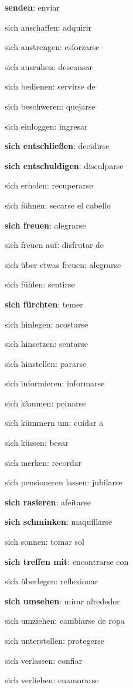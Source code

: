\begin{multicols}{2}
\begin{myitemize}
\item \textbf{senden}: enviar
\item sich anschaffen: adquirir
\item sich anstrengen: esforzarse
\item sich ausruhen: descansar
\item sich bedienen: servirse de
\item sich beschweren: quejarse
\item sich einloggen: ingresar
\item \textbf{sich entschließen}: decidirse
\item \textbf{sich entschuldigen}: disculparse
\item sich erholen: recuperarse
\item sich föhnen: secarse el cabello
\item \textbf{sich freuen}: alegrarse
\item sich freuen auf: disfrutar de
\item sich über etwas freuen: alegrarse
\item sich fühlen: sentirse
\item \textbf{sich fürchten}: temer
\item sich hinlegen: acostarse
\item sich hinsetzen: sentarse
\item sich hinstellen: pararse
\item sich informieren: informarse
\item sich kämmen: peinarse
\item sich kümmern um: cuidar a
\item sich küssen: besar
\item sich merken: recordar
\item sich pensioneren lassen: jubilarse
\item \textbf{sich rasieren}: afeitarse
\item \textbf{sich schminken}: maquillarse
\item sich sonnen: tomar sol
\item \textbf{sich treffen mit}: encontrarse con
\item sich überlegen: reflexionar
\item \textbf{sich umsehen}: mirar alrededor
\item sich umziehen: cambiarse de ropa
\item sich unterstellen: protegerse
\item sich verlassen: confiar
\item sich verlieben: enamorarse

\end{myitemize}
\end{multicols}
